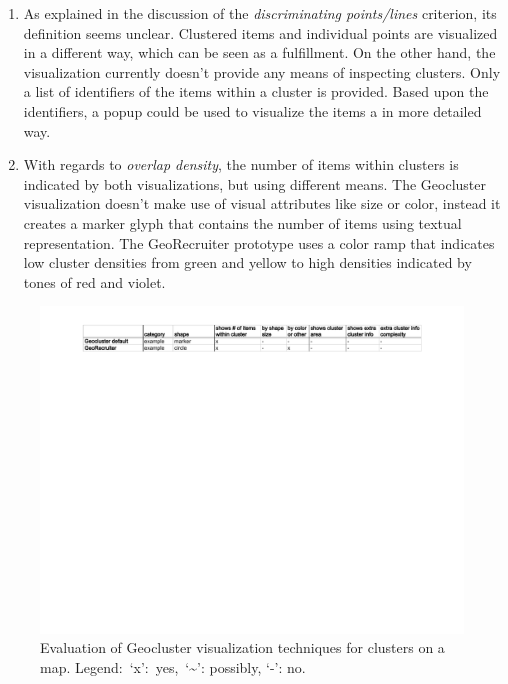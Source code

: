 \begin{enumerate}
\item As explained in the discussion of the \textit{discriminating points/lines} criterion, its definition seems unclear. Clustered items and individual points are visualized in a different way, which can be seen as a fulfillment. On the other hand, the visualization currently doesn't provide any means of inspecting clusters. Only a list of identifiers of the items within a cluster is provided. Based upon the identifiers, a popup could be used to visualize the items a in more detailed way.

\item With regards to \textit{overlap density}, the number of items within clusters is indicated by both visualizations, but using different means. The Geocluster visualization doesn't make use of visual attributes like size or color, instead it creates a marker glyph that contains the number of items using textual representation. The GeoRecruiter prototype uses a color ramp that indicates low cluster densities from green and yellow to high densities indicated by tones of red and violet.

\end{enumerate}

\begin{figure}[h]
  \begin{center}
    \hspace*{-1.5cm}\includegraphics[width=1.2\textwidth]{figures/vis_eval_geocluster.pdf}
    \caption{Evaluation of Geocluster visualization techniques for clusters on a map. Legend:~`x':~yes,~`\textasciitilde': possibly, `-': no.}
    \label{fig:vis-eval-geocluster}
  \end{center}
\end{figure}

